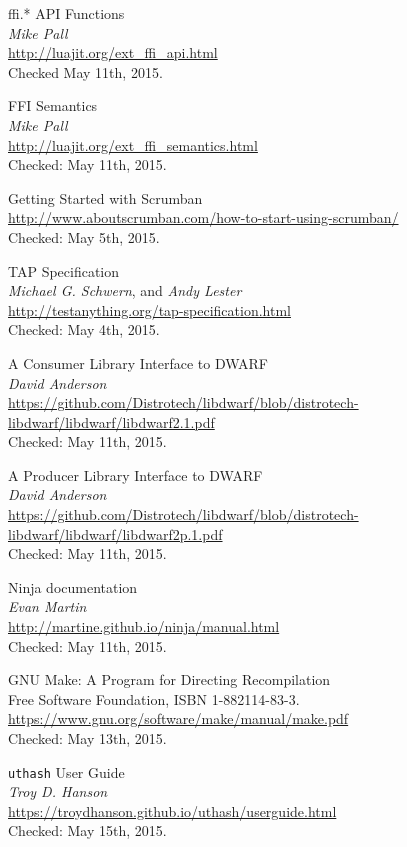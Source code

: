 \begin{thebibliography}{99}
		ffi.* API Functions \\
		\emph{Mike Pall} \\
		\url{http://luajit.org/ext_ffi_api.html} \\
		Checked May 11th, 2015.

		FFI Semantics \\
		\emph{Mike Pall} \\
		\url{http://luajit.org/ext_ffi_semantics.html} \\
		Checked: May 11th, 2015.

		Getting Started with Scrumban \\
		\url{http://www.aboutscrumban.com/how-to-start-using-scrumban/} \\
		Checked: May 5th, 2015.

		TAP Specification \\
		\emph{Michael G. Schwern}, and \emph{Andy Lester} \\
		\url{http://testanything.org/tap-specification.html} \\
		Checked: May 4th, 2015.

		A Consumer Library Interface to DWARF \\
		\emph{David Anderson} \\
		\url{https://github.com/Distrotech/libdwarf/blob/distrotech-libdwarf/libdwarf/libdwarf2.1.pdf} \\
		Checked: May 11th, 2015.

		A Producer Library Interface to DWARF \\
		\emph{David Anderson} \\
		\url{https://github.com/Distrotech/libdwarf/blob/distrotech-libdwarf/libdwarf/libdwarf2p.1.pdf} \\
		Checked: May 11th, 2015.

		Ninja documentation \\
		\emph{Evan Martin} \\
		\url{http://martine.github.io/ninja/manual.html} \\
		Checked: May 11th, 2015.

		GNU Make: A Program for Directing Recompilation \\
		Free Software Foundation, ISBN 1-882114-83-3. \\
		\url{https://www.gnu.org/software/make/manual/make.pdf} \\
		Checked: May 13th, 2015.

		\verb|uthash| User Guide \\
		\emph{Troy D. Hanson} \\
		\url{https://troydhanson.github.io/uthash/userguide.html} \\
		Checked: May 15th, 2015.

\end{thebibliography}

